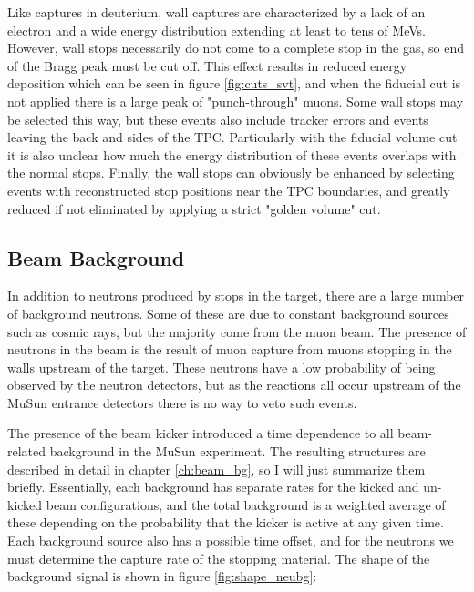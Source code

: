 Like captures in deuterium, wall captures are characterized by a lack of an electron and a wide energy distribution extending at least to tens of MeVs.  
However, wall stops necessarily do not come to a complete stop in the gas, so end of the Bragg peak must be cut off.
This effect results in reduced energy deposition which can be seen in figure \ref{fig:cuts_svt}, and when the fiducial cut is not applied there is a large peak of "punch-through" muons.
Some wall stops may be selected this way, but these events also include tracker errors and events leaving the back and sides of the TPC.
Particularly with the fiducial volume cut it is also unclear how much the energy distribution of these events overlaps with the normal stops.
Finally, the wall stops can obviously be enhanced by selecting events with reconstructed stop positions near the TPC boundaries, and greatly reduced if not eliminated by applying a strict "golden volume" cut.

\subsection{Beam Background}

In addition to neutrons produced by stops in the target, there are a large number of background neutrons.
Some of these are due to constant background sources such as cosmic rays, but the majority come from the muon beam.  
The presence of neutrons in the beam is the result of muon capture from muons stopping in the walls upstream of the target. 
These neutrons have a low probability of being observed by the neutron detectors, but as the reactions all occur upstream of the MuSun entrance detectors there is no way to veto such events.

The presence of the beam kicker introduced a time dependence to all beam-related background in the MuSun experiment.
The resulting structures are described in detail in chapter \ref{ch:beam_bg}, so I will just summarize them briefly.
Essentially, each background has separate rates for the kicked and un-kicked beam configurations, and the total background is a weighted average of these depending on the probability that the kicker is active at any given time.
Each background source also has a possible time offset, and for the neutrons we must determine the capture rate of the stopping material.
The shape of the background signal is shown in figure \ref{fig:shape_neubg}:

